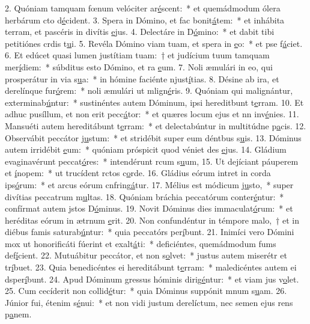 2. Quóniam tamquam fœnum velóciter ar\uline{é}scent:~* et quemádmodum ólera herbárum cto d\uline{é}cident.
3. Spera in Dómino, et fac bonit\uline{á}tem:~* et inhábita terram, et pascéris in divítis \uline{e}jus.
4. Delectáre in D\uline{ó}mino:~* et dabit tibi petitiónes crdis t\uline{u}i.
5. Revéla Dómino viam tuam, et spera in \uline{e}o:~* et pse f\uline{á}ciet.
6. Et edúcet quasi lumen justítiam tuam:~† et judícium tuum tamquam mer\uline{í}diem:~* súbditus esto Dómino, et ra \uline{e}um.
7. Noli æmulári in eo, qui prosperátur in via s\uline{u}a:~* in hómine faciénte njust\uline{í}tias.
8. Désine ab ira, et derelínque fur\uline{ó}rem:~* noli æmulári ut mlign\uline{é}ris.
9. Quóniam qui malignántur, exterminab\uline{ú}ntur:~* sustinéntes autem Dóminum, ipsi hereditbunt t\uline{e}rram.
10. Et adhuc pusíllum, et non erit pecc\uline{á}tor:~* et quæres locum ejus et nn inv\uline{é}nies.
11. Mansuéti autem hereditábunt t\uline{e}rram:~* et delectabúntur in multitúdne p\uline{a}cis.
12. Observábit peccátor j\uline{u}stum:~* et stridébit super eum déntbus s\uline{u}is.
13. Dóminus autem irridébit \uline{e}um:~* quóniam próspicit quod véniet des \uline{e}jus.
14. Gládium evaginavérunt peccat\uline{ó}res:~* intendérunt rcum s\uline{u}um,
15. Ut dejíciant páuperem et \uline{í}nopem:~* ut trucídent rctos c\uline{o}rde.
16. Gládius eórum intret in corda ips\uline{ó}rum:~* et arcus eórum cnfring\uline{á}tur.
17. Mélius est módicum j\uline{u}sto,~* super divítias peccatrum m\uline{u}ltas.
18. Quóniam bráchia peccatórum conter\uline{é}ntur:~* confírmat autem jstos D\uline{ó}minus.
19. Novit Dóminus dies immaculat\uline{ó}rum:~* et heréditas eórum in ætrnum \uline{e}rit.
20. Non confundéntur in témpore malo,~† et in diébus famis saturab\uline{ú}ntur:~* quia peccatórs per\uline{í}bunt.
21. Inimíci vero Dómini mox ut honorificáti fúerint et exalt\uline{á}ti:~* deficiéntes, quemádmodum fums def\uline{í}cient.
22. Mutuábitur peccátor, et non s\uline{o}lvet:~* justus autem miserétr et tr\uline{í}buet.
23. Quia benedicéntes ei hereditábunt t\uline{e}rram:~* maledicéntes autem ei dsper\uline{í}bunt.
24. Apud Dóminum gressus hóminis dirig\uline{é}ntur:~* et viam jus v\uline{o}let.
25. Cum cecíderit non collid\uline{é}tur:~* quia Dóminus suppónit mnum s\uline{u}am.
26. Júnior fui, étenim s\uline{é}nui:~* et non vidi justum derelíctum, nec semen ejus rens p\uline{a}nem.
